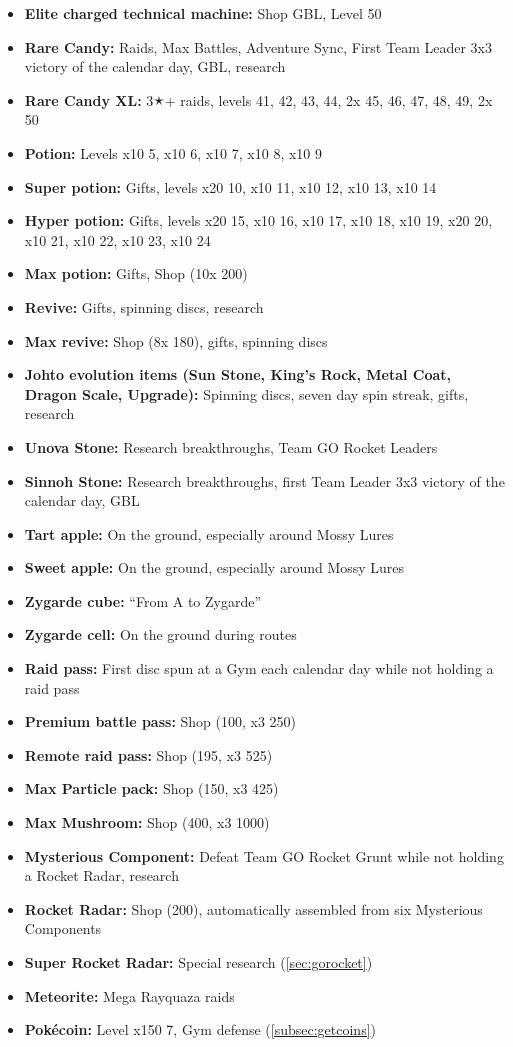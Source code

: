 \begin{itemize}
\item \textbf{Elite charged technical machine:} Shop GBL, Level 50
\item \textbf{Rare Candy:} Raids, Max Battles, Adventure Sync, First Team Leader 3x3 victory of the calendar day, GBL, research
\item \textbf{Rare Candy XL:} 3🟉+ raids, levels 41, 42, 43, 44, 2x 45, 46, 47, 48, 49, 2x 50
\item \textbf{Potion:} Levels x10 5, x10 6, x10 7, x10 8, x10 9
\item \textbf{Super potion:} Gifts, levels x20 10, x10 11, x10 12, x10 13, x10 14
\item \textbf{Hyper potion:} Gifts, levels x20 15, x10 16, x10 17, x10 18, x10 19, x20 20, x10 21, x10 22, x10 23, x10 24
\item \textbf{Max potion:} Gifts, Shop (10x 200\coin)
\item \textbf{Revive:} Gifts, spinning discs, research
\item \textbf{Max revive:} Shop (8x 180\coin), gifts, spinning discs
\item \textbf{Johto evolution items (Sun Stone, King's Rock, Metal Coat, Dragon Scale, Upgrade):} Spinning discs, seven day spin streak, gifts, research
\item \textbf{Unova Stone:} Research breakthroughs, Team GO Rocket Leaders
\item \textbf{Sinnoh Stone:} Research breakthroughs, first Team Leader 3x3 victory of the calendar day, GBL
\item \textbf{Tart apple:} On the ground, especially around Mossy Lures
\item \textbf{Sweet apple:} On the ground, especially around Mossy Lures
\item \textbf{Zygarde cube:} ``From A to Zygarde''
\item \textbf{Zygarde cell:} On the ground during routes
\item \textbf{Raid pass:} First disc spun at a Gym each calendar day while not holding a raid pass
\item \textbf{Premium battle pass:} Shop (100\coin, x3 250\coin)
\item \textbf{Remote raid pass:} Shop (195\coin, x3 525\coin)
\item \textbf{Max Particle pack:} Shop (150\coin, x3 425\coin)
\item \textbf{Max Mushroom:} Shop (400\coin, x3 1000\coin)
\item \textbf{Mysterious Component:} Defeat Team GO Rocket Grunt while not holding a Rocket Radar, research
\item \textbf{Rocket Radar:} Shop (200\coin), automatically assembled from six Mysterious Components
\item \textbf{Super Rocket Radar:} Special research (\autoref{sec:gorocket})
\item \textbf{Meteorite:} Mega Rayquaza raids
\item \textbf{Pokécoin:} Level x150 7, Gym defense (\autoref{subsec:getcoins})
\end{itemize}
